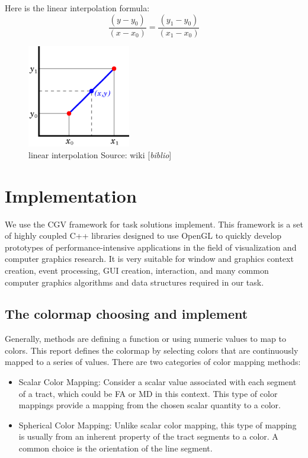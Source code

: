 \documentclass[hyperref, plainreport, noproblem]{cgvpub1}
\newcommand{\comment}[1]{{\color{red}[\textit{#1}]}}
\begin{document}
Here is the linear interpolation formula:
\begin{equation}
 \frac{(y-y_0)}{(x-x_0)} = \frac{(y_1-y_0)}{(x_1-x_0)}
\end{equation}

\begin{figure}[h]
	\centering
	\includegraphics[width=0.4\textwidth]{interp}
	\caption{ linear interpolation 
Source: wiki \comment{biblio}}
	\label{fig:interp}
\end{figure}

\chapter{Implementation}

We use the CGV framework for task solutions implement. This framework is a set of highly coupled C++ libraries designed to use OpenGL to quickly develop prototypes of performance-intensive applications in the field of visualization and computer graphics research. It is very suitable for window and graphics context creation, event processing, GUI creation, interaction, and many common computer graphics algorithms and data structures required in our task.

\section{The colormap choosing and implement}
Generally, methods are defining a function or using numeric values to map to colors. This report defines the colormap by selecting colors that are continuously mapped to a series of values. 
There are two categories of color mapping methods:
\begin{itemize}
	\item Scalar Color Mapping: Consider a scalar value associated with each segment of a tract, which could  be FA or MD in this context. This type of color mappings provide a mapping from the chosen scalar quantity to a color. 
	\item Spherical Color Mapping: Unlike scalar color mapping, this type of mapping is usually from an inherent property of the tract segments to a color. A common choice is the orientation of the line segment. 
\end{itemize}
\end{document}
